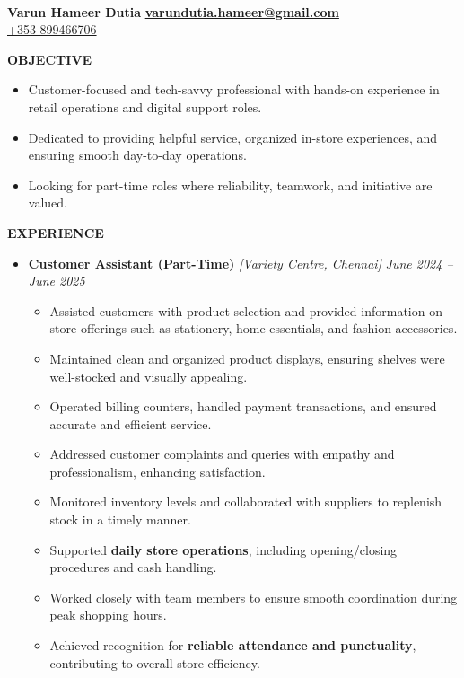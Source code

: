 \documentclass[a4paper,10pt]{article}
\newcommand{\resheading}[1]{{\small \colorbox{mygrey}{\begin{minipage}{0.975\textwidth}{\textbf{#1 \vphantom{p\^{E}}}}\end{minipage}}}}
\begin{document}
\hspace{0.5cm}\\[-1.8cm]

\textbf{Varun Hameer Dutia} \hspace{7.8cm} \href{mailto:varundutia.hameer@gmail.com}{\bf varundutia.hameer@gmail.com} \\
 \href{tel:+353899466706}{+353 899466706} 


\resheading{\textbf{OBJECTIVE} }

\begin{itemize}\itemsep -0.4em
    \item Customer-focused and tech-savvy professional with hands-on experience in retail operations and digital support roles.  
    \item Dedicated to providing helpful service, organized in-store experiences, and ensuring smooth day-to-day operations.  
    \item Looking for part-time roles where reliability, teamwork, and initiative are valued.  
\end{itemize}

\resheading{\textbf{EXPERIENCE} }

\begin{itemize}\itemsep -0.4em
    \item {\bf Customer Assistant (Part-Time)} \textit{[Variety Centre, Chennai]}  
    \textit{\hfill {June 2024 – June 2025}}
    \begin{itemize}\itemsep -0.3em
        \item Assisted customers with product selection and provided information on store offerings such as stationery, home essentials, and fashion accessories.  
        \item Maintained clean and organized product displays, ensuring shelves were well-stocked and visually appealing.  
        \item Operated billing counters, handled payment transactions, and ensured accurate and efficient service.  
        \item Addressed customer complaints and queries with empathy and professionalism, enhancing satisfaction.  
        \item Monitored inventory levels and collaborated with suppliers to replenish stock in a timely manner.  
        \item Supported \textbf{daily store operations}, including opening/closing procedures and cash handling.  
        \item Worked closely with team members to ensure smooth coordination during peak shopping hours.  
        \item Achieved recognition for \textbf{reliable attendance and punctuality}, contributing to overall store efficiency.  
    \end{itemize}
\end{itemize}
\end{document}
